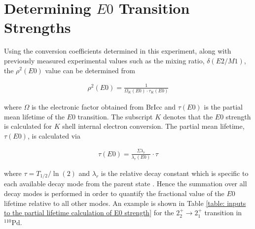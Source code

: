 \section{Determining $E0$ Transition Strengths} \label{sec:Determining E0 Transition Strengths}

Using the conversion coefficients determined in this experiment, along with previously measured experimental values such as the mixing ratio, $\delta(E2/M1)$, the $\rho^2(E0)$ value can be determined from \cite{Kibedi2005}

\begin{gather}
\rho^2(E0) = \frac{1}{\Omega_K(E0) \cdot \tau_K(E0)}
\label{equation: E0 strength via partial lifetimes}
\end{gather}

where $\Omega$ is the electronic factor obtained from BrIcc \cite{KIBEDI2008202} and $\tau(E0)$ is the partial mean lifetime of the $E0$ transition. The subscript $K$ denotes that the $E0$ strength is calculated for $K$ shell internal electron conversion. The partial mean lifetime, $\tau(E0)$, is calculated via

\begin{gather}
\tau(E0) = \frac{\Sigma \lambda_r}{\lambda_r(E0)} \cdot \tau
\label{equation: partial lifetime from relative decay constants}
\end{gather}

where $\tau = T_{1/2}/\ln(2)$ and $\lambda_r$ is the relative decay constant which is specific to each available decay mode from the parent state \cite{KraneText}. Hence the summation over all decay modes is performed in order to quantify the fractional value of the $E0$ lifetime relative to all other modes. An example is shown in Table \ref{table: inputs to the partial lifetime calculation of E0 strength} for the $2_2^+ \rightarrow 2_1^+$ transition in $^{110}\mathrm{Pd}$.


